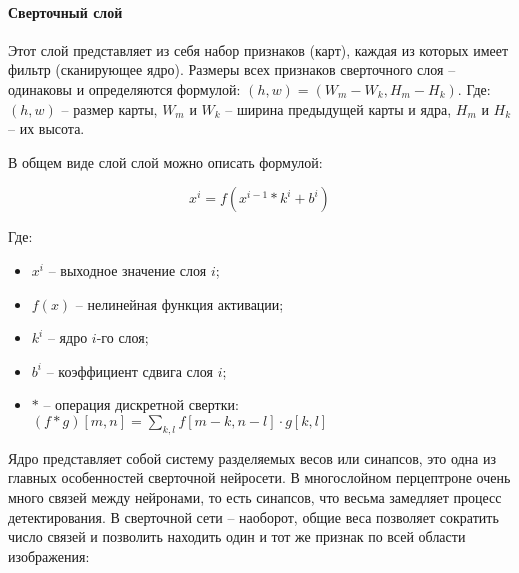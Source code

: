 \paragraph{Сверточный слой}

Этот слой представляет из себя набор признаков (карт), каждая из которых имеет фильтр (сканирующее ядро)\cite{lib-cnn}. Размеры всех признаков сверточного слоя -- одинаковы и определяются формулой: $(h,w) = (W_m-W_k, H_m-H_k)$. Где: $(h,w)$ -- размер карты, $W_m$ и $W_k$ -- ширина предыдущей карты и ядра, $H_m$ и $H_k$ -- их высота.

В общем виде слой слой можно описать формулой:

$$
x^i = f(x^{i-1}*k^i+b^i)
$$

Где:
\begin{itemize}
    \item $x^i$ -- выходное значение слоя $i$;
    \item $f(x)$ -- нелинейная функция активации;
    \item $k^i$ -- ядро $i$-го слоя;
    \item $b^i$ -- коэффициент сдвига слоя $i$;
    \item $*$ -- операция дискретной свертки: $(f*g)[m,n]=\sum_{k,l} f[m-k,n-l]\cdot g[k,l]$
\end{itemize}


Ядро представляет собой систему разделяемых весов или синапсов, это одна из главных особенностей сверточной нейросети. В многослойном перцептроне \cite{lib-perciptrone} очень много связей между нейронами, то есть синапсов, что весьма замедляет процесс детектирования. В сверточной сети -- наоборот, общие веса позволяет сократить число связей и позволить находить один и тот же признак по всей области изображения:

